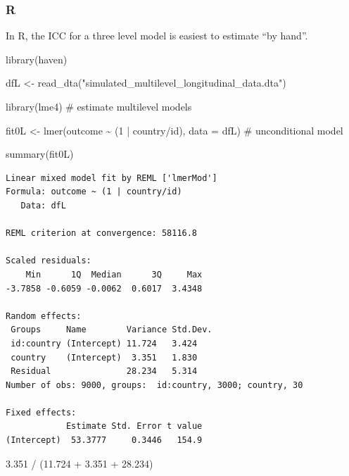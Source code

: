 \documentclass[
  letterpaper,
  DIV=11,
  numbers=noendperiod]{scrreprt}
\newenvironment{Shaded}{\begin{snugshade}}{\end{snugshade}}
\newcommand{\AttributeTok}[1]{\textcolor[rgb]{0.40,0.45,0.13}{#1}}
\newcommand{\CommentTok}[1]{\textcolor[rgb]{0.37,0.37,0.37}{#1}}
\newcommand{\DecValTok}[1]{\textcolor[rgb]{0.68,0.00,0.00}{#1}}
\newcommand{\FloatTok}[1]{\textcolor[rgb]{0.68,0.00,0.00}{#1}}
\newcommand{\FunctionTok}[1]{\textcolor[rgb]{0.28,0.35,0.67}{#1}}
\newcommand{\NormalTok}[1]{\textcolor[rgb]{0.00,0.23,0.31}{#1}}
\newcommand{\OtherTok}[1]{\textcolor[rgb]{0.00,0.23,0.31}{#1}}
\newcommand{\SpecialCharTok}[1]{\textcolor[rgb]{0.37,0.37,0.37}{#1}}
\newcommand{\StringTok}[1]{\textcolor[rgb]{0.13,0.47,0.30}{#1}}
\begin{document}
\subsubsection{R}

In R, the ICC for a three level model is easiest to estimate ``by
hand''.

\begin{Shaded}
\begin{Highlighting}[]
\FunctionTok{library}\NormalTok{(haven)}

\NormalTok{dfL }\OtherTok{\textless{}{-}} \FunctionTok{read\_dta}\NormalTok{(}\StringTok{"simulated\_multilevel\_longitudinal\_data.dta"}\NormalTok{)}
\end{Highlighting}
\end{Shaded}

\begin{Shaded}
\begin{Highlighting}[]
\FunctionTok{library}\NormalTok{(lme4) }\CommentTok{\# estimate multilevel models}

\NormalTok{fit0L }\OtherTok{\textless{}{-}} \FunctionTok{lmer}\NormalTok{(outcome }\SpecialCharTok{\textasciitilde{}}\NormalTok{ (}\DecValTok{1} \SpecialCharTok{|}\NormalTok{ country}\SpecialCharTok{/}\NormalTok{id),}
             \AttributeTok{data =}\NormalTok{ dfL) }\CommentTok{\# unconditional model}

\FunctionTok{summary}\NormalTok{(fit0L)}
\end{Highlighting}
\end{Shaded}

\begin{verbatim}
Linear mixed model fit by REML ['lmerMod']
Formula: outcome ~ (1 | country/id)
   Data: dfL

REML criterion at convergence: 58116.8

Scaled residuals: 
    Min      1Q  Median      3Q     Max 
-3.7858 -0.6059 -0.0062  0.6017  3.4348 

Random effects:
 Groups     Name        Variance Std.Dev.
 id:country (Intercept) 11.724   3.424   
 country    (Intercept)  3.351   1.830   
 Residual               28.234   5.314   
Number of obs: 9000, groups:  id:country, 3000; country, 30

Fixed effects:
            Estimate Std. Error t value
(Intercept)  53.3777     0.3446   154.9
\end{verbatim}

\begin{Shaded}
\begin{Highlighting}[]
\FloatTok{3.351} \SpecialCharTok{/}\NormalTok{ (}\FloatTok{11.724} \SpecialCharTok{+} \FloatTok{3.351} \SpecialCharTok{+} \FloatTok{28.234}\NormalTok{)}
\end{Highlighting}
\end{Shaded}
\end{document}

